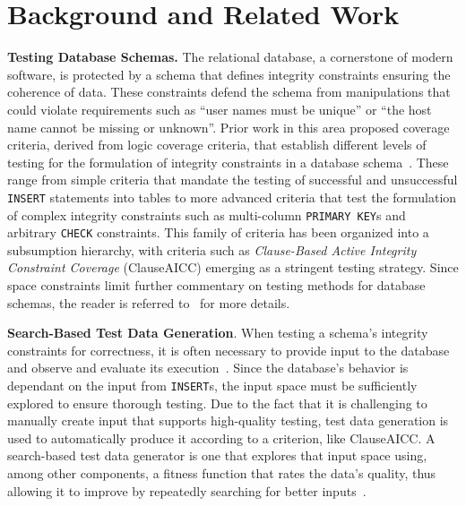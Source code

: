 
\vspace*{-.05in}
\section{Background and Related Work}
\vspace*{-.05in}




{\bf Testing Database Schemas.} The relational database, a cornerstone of modern software, is protected by a schema that
defines integrity constraints ensuring the coherence of data. These constraints defend the schema from manipulations
that could violate requirements such as ``user names must be unique'' or ``the host name cannot be missing or unknown''.
Prior work in this area proposed coverage criteria, derived from logic coverage criteria, that establish different
levels of testing for the formulation of integrity constraints in a database schema~\cite{mcminn2015}. These range from
simple criteria that mandate the testing of successful and unsuccessful {\tt INSERT} statements into tables to more
advanced criteria that test the formulation of complex integrity constraints such as multi-column {\tt PRIMARY~KEY}s and
arbitrary {\tt CHECK} constraints. This family of criteria has been organized into a subsumption hierarchy, with
criteria such as {\em Clause-Based Active Integrity Constraint Coverage} (ClauseAICC) emerging as a stringent testing
strategy. Since space constraints limit further commentary on testing methods for database schemas, the reader is
referred to~\cite{mcminn2015} for more details.


{\bf Search-Based Test Data Generation}. When testing a schema's integrity constraints for correctness, it is often
necessary to provide input to the database and observe and evaluate its execution~\cite{kapfhammer2013}.  Since the
database's behavior is dependant on the input from {\tt INSERT}s, the input space must be sufficiently explored to ensure
thorough testing.  Due to the fact that it is challenging to manually create input that supports high-quality testing,
test data generation is used to automatically produce it according to a criterion, like ClauseAICC. A search-based test
data generator is one that explores that input space using, among other components, a fitness function that rates the
data's quality, thus allowing it to improve by repeatedly searching for better inputs~\cite{mcminn2004a}.

